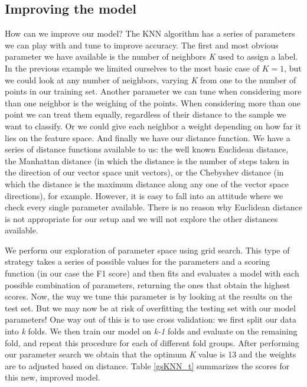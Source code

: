 \documentclass[12pt]{article}
\begin{document}
\subsection*{Improving the model}
How can we improve our model? The KNN algorithm has a series of parameters we can play with and tune to improve accuracy. The first and most obvious parameter we have available is the number of neighbors \textit{K} used to assign a label. In the previous example we limited ourselves to the most basic case of $K=1$, but we could look at any number of neighbors, varying \textit{K} from one to the number of points in our training set. Another parameter we can tune when considering more than one neighbor is the weighing of the points. When considering  more than one point we can treat them equally, regardless of their distance to the sample we want to classify. Or we could give each neighbor a weight depending on how far it lies on the feature space. And finally we have our distance function. We have a series of distance functions available to us: the well known Euclidean distance, the Manhattan distance (in which the distance is the number of steps taken in the direction of our vector space unit vectors), or the Chebyshev distance (in which the distance is the maximum distance along any one of the vector space directions), for example. However, it is easy to fall into an attitude where we check every single parameter available. There is no reason why Euclidean distance is not appropriate for our setup and we will not explore the other distances available.
\medskip

We perform our exploration of parameter space using grid search. This type of strategy takes a series of possible values for the parameters and a scoring function (in our case the F1 score) and then fits and evaluates a model with each possible combination of parameters, returning the ones that obtain the highest scores. Now, the way we tune this parameter is by looking at the results on the test set. But we may now be at risk of overfitting the testing set with our model parameters! One way out of this is to use cross validation: we first split our data into \textit{k} folds. We then train our model on \textit{k-1} folds and evaluate on the remaining fold, and repeat this procedure for each of different fold groups. After performing our parameter search we obtain that the optimum \textit{K} value is 13 and the weights are to adjusted based on distance. Table \ref{gsKNN_t} summarizes the scores for this new, improved model.
\end{document}
